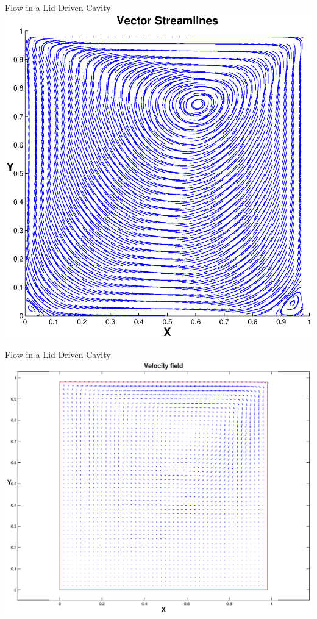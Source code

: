 \documentclass[frames]{prosper}
\begin{document}



\begin{slide}[Dissolve]{Flow in a Lid-Driven Cavity}
\includegraphics[scale=.4]{dcavity.eps}
\end{slide}

\begin{slide}[Dissolve]{Flow in a Lid-Driven Cavity}
\includegraphics[scale = .3]{dcavity_velocityfield}
\end{slide}
\end{document}
